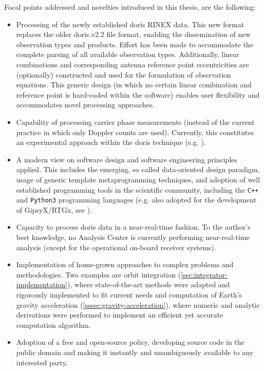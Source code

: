 Focal points addressed and novelties introduced in this thesis, are the following:
\begin{itemize}
  \item Processing of the newly established \gls{doris} RINEX data. This new 
   format replaces the older doris.v2.2 file format, enabling the dissemination 
   of new observation types and products. Effort has been made to accommodate 
   the complete parsing of all available observation types. Additionally, linear
  combinations and corresponding antenna reference point eccentricities are 
  (optionally) constructed and used for the formulation of observation equations. 
  This generic design (in which no certain linear combination and reference point 
  is hard-coded within the software) enables user flexibility and accommodates 
  novel processing approaches.
  \item Capability of processing carrier phase measurements (instead of the current 
  practice in which only Doppler counts are used). Currently, this constitutes an 
  experimental approach within the \gls{doris} technique (e.g. \cite{Mercier2010}).
  \item A modern view on software design and software engineering principles applied. 
  This includes the emerging, so called data-oriented design paradigm, usage of 
  generic template metaprogramming techniques, and adoption of well established 
  programming tools in the scientific community, including the \texttt{C++} and 
  \texttt{Python3} programming languages (e.g. also adopted for the development 
  of GipsyX/RTGx, see \cite{Bertiger2020}).
  \item Capacity to process \gls{doris} data in a near-real-time fashion. To the 
  author's best knowledge, no Analysis Center is currently performing near-real-time 
  analysis (except for the operational on-board receiver systems).
  \item Implementation of home-grown approaches to complex problems and methodologies. 
  Two examples are orbit integration (\autoref{sec:integrator-implementation}), 
  where state-of-the-art methods were adapted and rigorously implemented to fit 
  current needs and computation of Earth's gravity acceleration 
  (\autoref{sssec:gravity-acceleration}), where numeric and analytic derivations were 
  performed to implement an efficient yet accurate computation algorithm.
  \item Adoption of a free and open-source policy, developing source code in the 
  public domain and making it instantly and unambiguously available to any interested 
  party.
\end{itemize}

